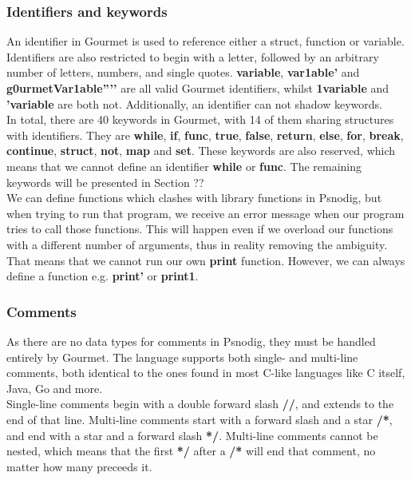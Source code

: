\subsubsection{Identifiers and keywords}

An identifier in Gourmet is used to reference either a struct, function or variable. Identifiers are also restricted to begin with a letter, followed by an arbitrary number of letters, numbers, and single quotes. \textbf{variable}, \textbf{var1able’} and \textbf{g0urmetVar1able''’'} are all valid Gourmet identifiers, whilst \textbf{1variable} and \textbf{'variable} are both not. Additionally, an identifier can not shadow keywords. \hfill \\

In total, there are 40 keywords in Gourmet, with 14 of them sharing structures with identifiers. They are \textbf{while}, \textbf{if}, \textbf{func}, \textbf{true}, \textbf{false}, \textbf{return}, \textbf{else}, \textbf{for}, \textbf{break}, \textbf{continue}, \textbf{struct}, \textbf{not}, \textbf{map} and \textbf{set}. These keywords are also reserved, which means that we cannot define an identifier \textbf{while} or \textbf{func}. The remaining keywords will be presented in Section ?? \hfill \\

We can define functions which clashes with library functions in Psnodig, but when trying to run that program, we receive an error message when our program tries to call those functions. This will happen even if we overload our functions with a different number of arguments, thus in reality removing the ambiguity. That means that we cannot run our own \textbf{print} function. However, we can always define a function e.g. \textbf{print’} or \textbf{print1}. \hfill \\

\subsubsection{Comments}

As there are no data types for comments in Psnodig, they must be handled entirely by Gourmet. The language supports both single- and multi-line comments, both identical to the ones found in most C-like languages like C itself, Java, Go and more. \hfill \\

Single-line comments begin with a double forward slash \textbf{//}, and extends to the end of that line. Multi-line comments start with a forward slash and a star \textbf{/*}, and end with a star and a forward slash \textbf{*/}. Multi-line comments cannot be nested, which means that the first \textbf{*/} after a \textbf{/*} will end that comment, no matter how many \textbf{\*} preceeds it. \hfill \\

